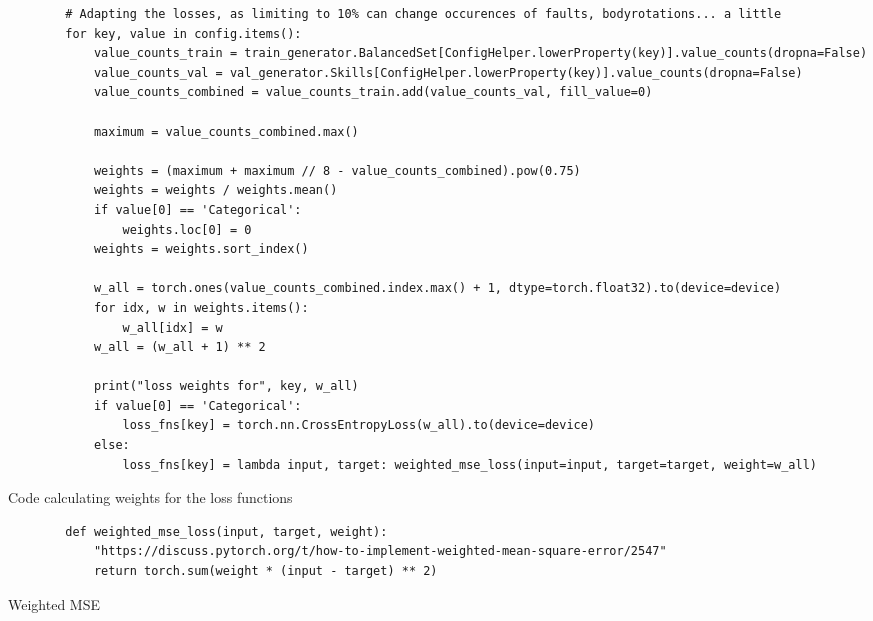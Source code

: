 \begin{listing}
    \begin{verbatim}
        # Adapting the losses, as limiting to 10% can change occurences of faults, bodyrotations... a little
        for key, value in config.items():
            value_counts_train = train_generator.BalancedSet[ConfigHelper.lowerProperty(key)].value_counts(dropna=False)
            value_counts_val = val_generator.Skills[ConfigHelper.lowerProperty(key)].value_counts(dropna=False)
            value_counts_combined = value_counts_train.add(value_counts_val, fill_value=0)
        
            maximum = value_counts_combined.max()
        
            weights = (maximum + maximum // 8 - value_counts_combined).pow(0.75)
            weights = weights / weights.mean()
            if value[0] == 'Categorical':
                weights.loc[0] = 0
            weights = weights.sort_index()
        
            w_all = torch.ones(value_counts_combined.index.max() + 1, dtype=torch.float32).to(device=device)
            for idx, w in weights.items():
                w_all[idx] = w
            w_all = (w_all + 1) ** 2
        
            print("loss weights for", key, w_all)
            if value[0] == 'Categorical':
                loss_fns[key] = torch.nn.CrossEntropyLoss(w_all).to(device=device)
            else:
                loss_fns[key] = lambda input, target: weighted_mse_loss(input=input, target=target, weight=w_all)
    \end{verbatim}
    \caption[Code calculating weights for the loss functions]{Code calculating weights for the loss functions}
    \label{code:recognition-weighted-loss}
\end{listing}

\begin{listing}
    \begin{verbatim}
        def weighted_mse_loss(input, target, weight):
            "https://discuss.pytorch.org/t/how-to-implement-weighted-mean-square-error/2547"
            return torch.sum(weight * (input - target) ** 2)
    \end{verbatim}
    \caption[Weihted MSE]{Weighted MSE}
    \label{code:weighted-mse}
\end{listing}

